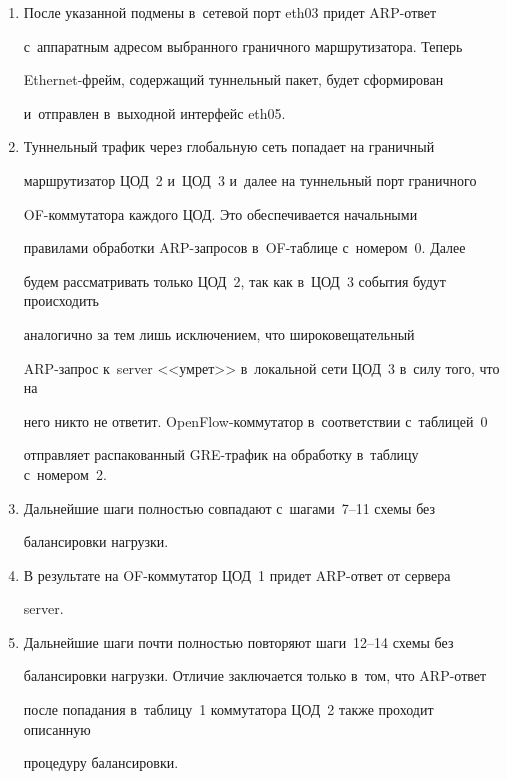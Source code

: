 \begin{enumerate}[1.]
Обратная трансформация выполняется по правилу: ARP-от\-вет 


с~па\-ра\-мет\-рами


$$


\mbox{arp\_spa} = 172.16.10\mathrm{N}.1,\enskip  


\mbox{arp\_tpa}\;=172.16.10\mathrm{N}.(\mathrm{M}+1),


$$


пришедший в~порт eth0P, преобразуется в~ARP-от\-вет


$$


\mbox{arp\_spa} =172.16.10\mathrm{M}.\mathrm{P},\enskip 


\mbox{arp\_tpa}=172.16.10\mathrm{N}.2


$$


и отправляется в~порт eth03.


\item После указанной подмены в~сетевой порт eth03 придет ARP-от\-вет 


с~аппаратным адресом выбранного граничного маршрутизатора. Теперь 


Ethernet-фрейм, содержащий туннельный пакет, будет сформирован 


и~отправлен в~выходной интерфейс eth05.


\item Туннельный трафик через глобальную сеть попадает на граничный 


маршрутизатор ЦОД~2 и~ЦОД~3 и~далее на туннельный порт граничного  


OF-ком\-му\-та\-то\-ра каждого ЦОД. Это обеспечивается начальными 


правилами обработки ARP-за\-про\-сов в~OF-таб\-ли\-це с~номером~0. Далее 


будем рассматривать только ЦОД~2, так как в~ЦОД~3 события будут происходить 


аналогично за тем лишь исключением, что широковещательный  


ARP-за\-прос к~server <<умрет>> в~локальной сети ЦОД~3 в~силу того, что на 


него никто не ответит. OpenFlow-ком\-му\-та\-тор в~соответствии с~таблицей~0 


отправляет распакованный GRE-тра\-фик на обработку в~таблицу с~номером~2.


\item Дальнейшие шаги полностью совпадают с~шагами~7--11 схемы без 


балансировки нагрузки.


\item В результате на OF-ком\-му\-та\-тор ЦОД~1 придет ARP-от\-вет от сервера 


server.


\item Дальнейшие шаги почти полностью повторяют шаги~12--14 схемы без 


балансировки нагрузки. Отличие заключается только в~том, что ARP-от\-вет 


после попадания в~таблицу~1 коммутатора ЦОД~2 также проходит описанную 


процедуру балансировки.


  \end{enumerate}
